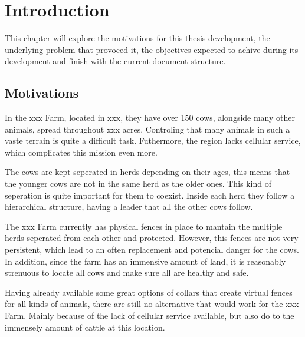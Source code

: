 
%

\chapter{Introduction}
\label{cha:introduction}
This chapter will explore the motivations for this thesis development, the
underlying problem that provoced it, the objectives expected to achive during its
development and finish with the current document structure.

\section{Motivations}
\label{sec:motivations}
In the xxx Farm, located in xxx, they have over 150 cows, alongside many other animals,
spread throughout xxx acres. Controling that many animals in such a vaste terrain is quite a
difficult task. Futhermore, the region lacks cellular service, which complicates this
mission even more.

The cows are kept seperated in herds depending on their ages, this means that the
younger cows are not in the same herd as the older ones. This kind of seperation
is quite important for them to coexist. Inside each herd they follow a hierarchical
structure, having a leader that all the other cows follow.

The xxx Farm currently has physical fences in place to mantain the multiple
herds seperated from each other and protected. However, this fences are
not very persistent, which lead to an often replacement and potencial danger for
the cows. In addition, since the farm has an immensive amount of land, it is
reasonably strenuous to locate all cows and make sure all are healthy and safe.

Having already available some great options of collars that create virtual fences
for all kinds of animals, there are still no alternative that would work for
the xxx Farm. Mainly because of the lack of cellular service
available, but also do to the immensely amount of cattle at this location.





